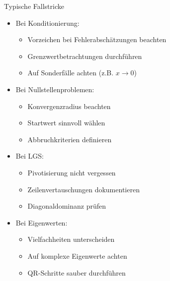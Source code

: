 \begin{concept}{Typische Fallstricke}
\begin{itemize}
    \item Bei Konditionierung:
    \begin{itemize}
        \item Vorzeichen bei Fehlerabschätzungen beachten
        \item Grenzwertbetrachtungen durchführen
        \item Auf Sonderfälle achten (z.B. $x \to 0$)
    \end{itemize}
    
    \item Bei Nullstellenproblemen:
    \begin{itemize}
        \item Konvergenzradius beachten
        \item Startwert sinnvoll wählen
        \item Abbruchkriterien definieren
    \end{itemize}
    
    \item Bei LGS:
    \begin{itemize}
        \item Pivotisierung nicht vergessen
        \item Zeilenvertauschungen dokumentieren
        \item Diagonaldominanz prüfen
    \end{itemize}
    
    \item Bei Eigenwerten:
    \begin{itemize}
        \item Vielfachheiten unterscheiden
        \item Auf komplexe Eigenwerte achten
        \item QR-Schritte sauber durchführen
    \end{itemize}
\end{itemize}
\end{concept}

